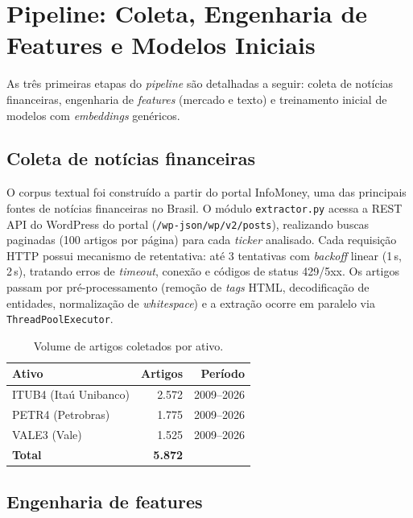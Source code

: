 \chapter{Pipeline: Coleta, Engenharia de Features e Modelos Iniciais}\label{cap:pipeline}

As três primeiras etapas do \textit{pipeline} são detalhadas a seguir: coleta de notícias financeiras, engenharia de \textit{features} (mercado e texto) e treinamento inicial de modelos com \textit{embeddings} genéricos.

\section{Coleta de notícias financeiras}\label{sec:coleta}

O corpus textual foi construído a partir do portal InfoMoney, uma das principais fontes de notícias financeiras no Brasil. O módulo \texttt{extractor.py} acessa a REST API do WordPress do portal (\texttt{/wp-json/wp/v2/posts}), realizando buscas paginadas (100 artigos por página) para cada \textit{ticker} analisado. Cada requisição HTTP possui mecanismo de retentativa: até 3 tentativas com \textit{backoff} linear (1\,s, 2\,s), tratando erros de \textit{timeout}, conexão e códigos de status 429/5xx. Os artigos passam por pré-processamento (remoção de \textit{tags} HTML, decodificação de entidades, normalização de \textit{whitespace}) e a extração ocorre em paralelo via \texttt{ThreadPoolExecutor}.

\begin{table}[htb]
\centering
\caption{Volume de artigos coletados por ativo.}\label{tab:artigos}
\begin{tabular}{lrr}
\toprule
\textbf{Ativo} & \textbf{Artigos} & \textbf{Período} \\
\midrule
ITUB4 (Itaú Unibanco) & 2.572 & 2009--2026 \\
PETR4 (Petrobras)     & 1.775 & 2009--2026 \\
VALE3 (Vale)          & 1.525 & 2009--2026 \\
\midrule
\textbf{Total}        & \textbf{5.872} & \\
\bottomrule
\end{tabular}
\end{table}

\section{Engenharia de features}\label{sec:features}

